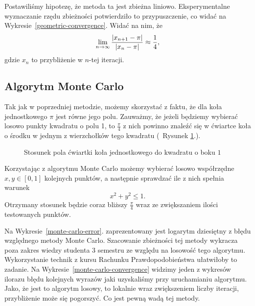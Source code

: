Postawiliśmy hipotezę, że metoda ta jest zbieżna liniowo. Eksperymentalne wyznaczanie rzędu zbieżności potwierdziło to przypuszczenie, co widać na Wykresie~\ref{geometric-convergence}. Widać na nim, że
$$\lim_{n\to\infty}{|x_{n+1}-\pi|\over |x_n-\pi|}\approx\frac14,$$
gdzie $x_n$ to przybliżenie w $n$-tej iteracji.

\subsection{Algorytm Monte Carlo}

Tak jak w poprzedniej metodzie, możemy skorzystać z faktu, że dla koła jednostkowego $\pi$ jest równe jego polu. Zauważmy, że jeżeli będziemy wybierać losowo punkty kwadratu o polu 1, to $\frac\pi4$ z nich powinno znaleźć się w ćwiartce koła o środku w jednym z wierzchołków tego kwadratu (~Rysunek \ref{fig:monte-carlo}.).

\begin{figure}[!h]\centering
{}
\caption{Stosunek pola ćwiartki koła jednostkowego do kwadratu o boku $1$}
\label{fig:monte-carlo}
\end{figure}

Korzystając z algorytmu Monte Carlo możemy wybierać losowo współrzędne $x,y\in[0,1]$ kolejnych punktów, a następnie sprawdzać ile z nich spełnia warunek
$$x^2+y^2\leq1.$$
Otrzymany stosunek będzie coraz bliższy $\frac\pi4$ wraz ze zwiększaniem ilości testowanych punktów.

Na Wykresie~\ref{monte-carlo-error}. zaprezentowany jest logarytm dziesiętny z błędu względnego metody Monte Carlo. Szacowanie zbieżności tej metody wykracza poza zakres wiedzy studenta 3 semestru ze względu na losowość tego algorytmu. Wykorzystanie technik z kursu Rachunku Prawdopodobieństwa ułatwiłoby to zadanie. Na Wykresie~\ref{monte-carlo-convergence} widzimy jeden z wykresów ilorazu błędu kolejnych wyrazów jaki uzyskaliśmy przy uruchamianiu algorytmu. Jako, że jest to algorytm losowy, to lokalnie wraz zwiększeniem liczby iteracji, przybliżenie może się pogorszyć. Co jest pewną wadą tej metody.

